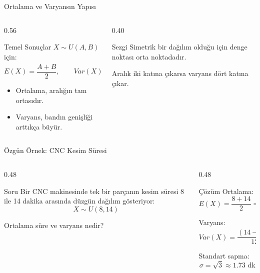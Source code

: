 \documentclass[light]{lutbeamer}
\begin{document}
\begin{frame}{Ortalama ve Varyansın Yapısı}
\small
\begin{columns}[T,onlytextwidth]
    \begin{column}{0.56\textwidth}
        \begin{block}{Temel Sonuçlar}
            $X \sim U(A,B)$ için:
            \[
            E(X)=\frac{A+B}{2},
            \qquad
            Var(X)=\frac{(B-A)^2}{12}
            \]
        \end{block}

        \begin{itemize}
            \item Ortalama, aralığın tam ortasıdır.
            \item Varyans, bandın genişliği arttıkça büyür.
        \end{itemize}
    \end{column}
    \begin{column}{0.40\textwidth}
        \begin{exampleblock}{Sezgi}
            Simetrik bir dağılım olduğu için denge noktası orta noktadadır.

            \vspace{0.15cm}
            Aralık iki katına çıkarsa varyans dört katına çıkar.
        \end{exampleblock}
    \end{column}
\end{columns}
\end{frame}

\begin{frame}{Özgün Örnek: CNC Kesim Süresi}
\small
\begin{columns}[T,onlytextwidth]
    \begin{column}{0.48\textwidth}
        \begin{block}{Soru}
            Bir CNC makinesinde tek bir parçanın kesim süresi 8 ile 14 dakika arasında düzgün dağılım gösteriyor:
            \[
            X \sim U(8,14)
            \]

            \vspace{0.15cm}
            Ortalama süre ve varyans nedir?
        \end{block}
    \end{column}
    \begin{column}{0.48\textwidth}
        \begin{exampleblock}{Çözüm}
            Ortalama:
            \[
            E(X)=\frac{8+14}{2}=11 \text{ dk}
            \]

            Varyans:
            \[
            Var(X)=\frac{(14-8)^2}{12}=\frac{36}{12}=3
            \]

            Standart sapma:
            \[
            \sigma=\sqrt{3}\approx 1.73 \text{ dk}
            \]
        \end{exampleblock}
    \end{column}
\end{columns}
\end{frame}
\end{document}
